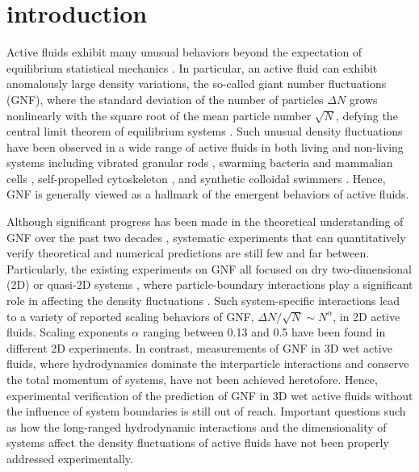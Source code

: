 \documentclass[twocolumn,aps,prx,amsmath,amssymb,longbibliography,superscriptaddress]{revtex4-2}
\begin{document}
\section{introduction}

Active fluids exhibit many unusual behaviors beyond the expectation of equilibrium statistical mechanics \cite{Ramaswamy2010,Cates2012,Marchetti2013,Poon2013,Elgeti2015}.
In particular, an active fluid can exhibit anomalously large density variations, the so-called giant number fluctuations (GNF), where the standard deviation of the number of particles $\Delta N$ grows nonlinearly with the square root of the mean particle number $\sqrt N$, defying the central limit theorem of equilibrium systems \cite{Mishin2015}.
Such unusual density fluctuations have been observed in a wide range of active fluids in both living and non-living systems including vibrated granular rods \cite{Narayan2007,Aranson2008,Kudrolli2008,Deseigne2010}, swarming bacteria \cite{Zhang2010,Nishiguchi2017} and mammalian cells \cite{Kawaguchi2017},
self-propelled cytoskeleton \cite{Schaller2013}, and synthetic colloidal swimmers \cite{Palacci2013,Karani2019}. Hence, GNF is generally viewed as a hallmark of the emergent behaviors of active fluids.


Although significant progress has been made in the theoretical understanding of GNF over the past two decades \cite{Toner1995, Tu1998, Toner1998, AditiSimha2002, Ramaswamy2003, Toner2005, Chate2008, Mishra2010, Dey2012, Saintillan2012, Saintillan2013, Ngo2014,  Mahault2019}, systematic experiments that can quantitatively verify theoretical and numerical predictions are still few and far between. Particularly, the existing experiments on GNF all focused on dry two-dimensional (2D) or quasi-2D systems \cite{Narayan2007, Aranson2008, Kudrolli2008, Deseigne2010, Zhang2010, Schaller2013, Nishiguchi2017, Kawaguchi2017, Palacci2013}, where particle-boundary interactions play a significant role in affecting the density fluctuations \cite{Marchetti2013}. Such system-specific interactions lead to a variety of reported scaling behaviors of GNF, $\Delta N/\sqrt N \sim N^\alpha$, in 2D active fluids. Scaling exponents $\alpha$ ranging between 0.13 and 0.5 have been found in different 2D experiments. In contrast, measurements of GNF in 3D wet active fluids, where hydrodynamics dominate the interparticle interactions and conserve the total momentum of systems, have not been achieved heretofore. Hence, experimental verification of the prediction of GNF in 3D wet active fluids without the influence of system boundaries is still out of reach. Important questions such as how the long-ranged hydrodynamic interactions and the dimensionality of systems affect the density fluctuations of active fluids have not been properly addressed experimentally.
\end{document}
